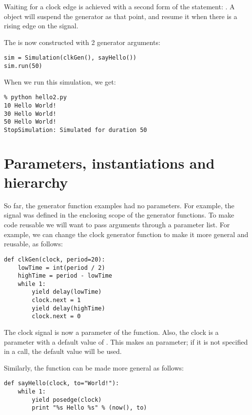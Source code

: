 Waiting for a clock edge is achieved with a second form of the
 statement: . 
A  object will suspend the generator as that point,
and resume it when there is a rising edge on the signal.

The  is now constructed with 2 generator arguments:

\begin{verbatim}
sim = Simulation(clkGen(), sayHello())
sim.run(50)

\end{verbatim}

When we run this simulation, we get:

\begin{verbatim}
% python hello2.py
10 Hello World!
30 Hello World!
50 Hello World!
StopSimulation: Simulated for duration 50

\end{verbatim}


\section{Parameters, instantiations and hierarchy}

So far, the generator function examples had no parameters. For
example, the  signal was defined in the enclosing scope of
the generator functions. To make code reusable we will
want to pass arguments through a parameter list. For example, we can
change the clock generator function to make it more general
and reusable, as follows:

\begin{verbatim}
def clkGen(clock, period=20):
    lowTime = int(period / 2)
    highTime = period - lowTime
    while 1:
        yield delay(lowTime)
        clock.next = 1
        yield delay(highTime)
        clock.next = 0

\end{verbatim}

The clock signal is now a parameter of the function. Also, the clock
 is a parameter with a default value of .
This makes  an  parameter; if it is not
specified in a call, the default value will be used.

Similarly, the  function can be made more general as follows:

\begin{verbatim}
def sayHello(clock, to="World!"):
    while 1:
        yield posedge(clock)
        print "%s Hello %s" % (now(), to)

\end{verbatim}

